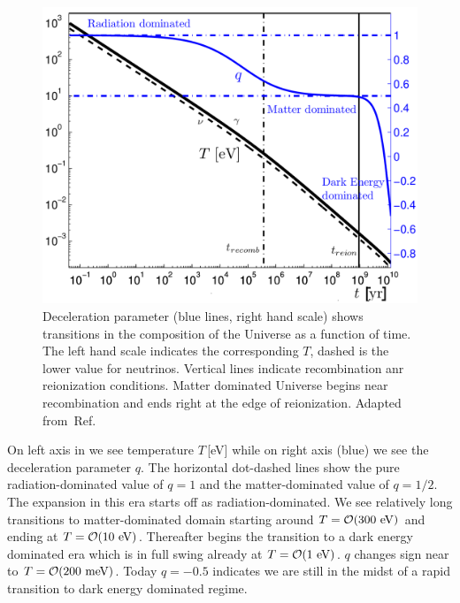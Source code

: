 \begin{figure}
\centerline{\includegraphics[width=0.88\linewidth]{01-introduction/Figures/Tqtoday.png}}
\caption{Deceleration parameter (blue lines, right hand scale) shows  transitions in the composition of the Universe as a function of time. The left hand scale indicates the corresponding $T$, dashed is the lower value for neutrinos. Vertical lines indicate recombination anr reionization conditions. Matter dominated Universe begins near recombination and ends right at the edge of reionization.  Adapted from~Ref.\,\cite{Rafelski:2013yka}
\label{fig:today} }
\end{figure}

On left axis in   we see temperature $T$\,[eV] while on right axis (blue) we see the deceleration parameter $q$. The horizontal dot-dashed lines show the pure radiation-dominated value of $q=1$ and the matter-dominated value of $q=1/2$. The expansion in this era starts off as radiation-dominated. We see relatively long transitions to matter-dominated domain starting around $T=\mathcal{O}(300\text{ eV})$ and  ending at $T=\mathcal{O}(10\text{ eV})$. Thereafter begins the transition to a dark energy dominated era which is in full swing already at  $T=\mathcal{O}(1\text{ eV})$. $q$ changes sign near to  $T=\mathcal{O}(200\text{ meV})$. Today $q=-0.5$ indicates we are still in the midst of a rapid transition to dark energy dominated regime. 


